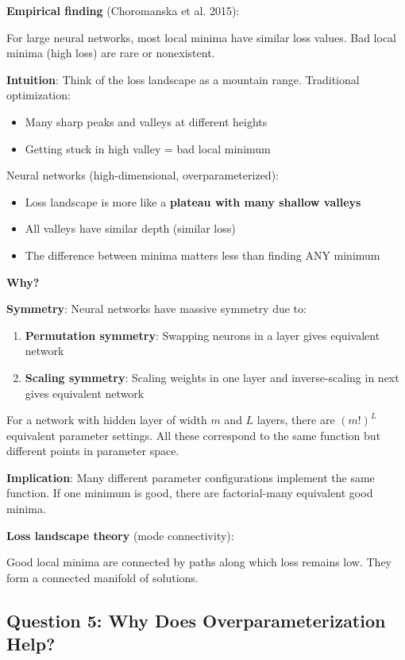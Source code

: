 \documentclass[11pt,oneside]{book}
\begin{document}
\textbf{Empirical finding} (Choromanska et al. 2015):

For large neural networks, most local minima have similar loss values. Bad local minima (high loss) are rare or nonexistent.

\textbf{Intuition}: Think of the loss landscape as a mountain range. Traditional optimization:
\begin{itemize}
\item Many sharp peaks and valleys at different heights
\item Getting stuck in high valley = bad local minimum
\end{itemize}

Neural networks (high-dimensional, overparameterized):
\begin{itemize}
\item Loss landscape is more like a \textbf{plateau with many shallow valleys}
\item All valleys have similar depth (similar loss)
\item The difference between minima matters less than finding ANY minimum
\end{itemize}

\textbf{Why?}

\textbf{Symmetry}: Neural networks have massive symmetry due to:
\begin{enumerate}
\item \textbf{Permutation symmetry}: Swapping neurons in a layer gives equivalent network
\item \textbf{Scaling symmetry}: Scaling weights in one layer and inverse-scaling in next gives equivalent network
\end{enumerate}

For a network with hidden layer of width $m$ and $L$ layers, there are $(m!)^L$ equivalent parameter settings. All these correspond to the same function but different points in parameter space.

\textbf{Implication}: Many different parameter configurations implement the same function. If one minimum is good, there are factorial-many equivalent good minima.

\textbf{Loss landscape theory} (mode connectivity):

Good local minima are connected by paths along which loss remains low. They form a connected manifold of solutions.

\subsection{Question 5: Why Does Overparameterization Help?}
\end{document}
